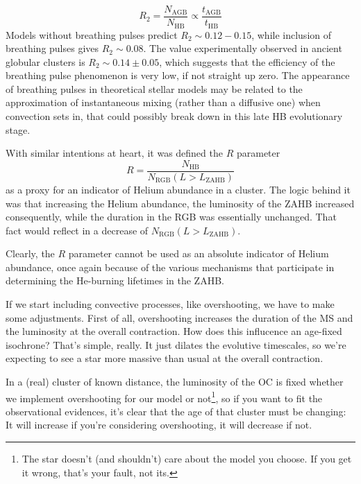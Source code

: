 \begin{equation}
    R_{2} = \frac{N_{\text{AGB}}}{N_{\text{HB}}}\propto \frac{t_{\text{AGB}}}{t_{\text{HB}}}
    \label{eq:r2param}
\end{equation}
Models without breathing pulses predict $R_{2}\sim 0.12-0.15$, while inclusion of breathing pulses gives $R_{2}\sim 0.08$. The value experimentally observed in ancient globular clusters is $R_{2}\sim 0.14 \pm 0.05$, which suggests that the efficiency of the breathing pulse phenomenon is very low, if not straight up zero. The appearance of breathing pulses in theoretical stellar models may be related to the approximation of instantaneous mixing (rather than a diffusive one) when convection sets in, that could possibly break down in this late HB evolutionary stage.
\par With similar intentions at heart, it was defined the $R$ parameter
\begin{equation}
    R = \frac{N_{\text{HB}}}{N_{\text{RGB}}(L>L_{\text{ZAHB}})}
    \label{eq:rparam}
\end{equation}
as a proxy for an indicator of Helium abundance in a cluster. The logic behind it was that increasing the Helium abundance, the luminosity of the ZAHB increased consequently, while the duration in the RGB was essentially unchanged. That fact would reflect in a decrease of $N_{\text{RGB}}(L>L_{\text{ZAHB}})$.
\par Clearly, the $R$ parameter cannot be used as an absolute indicator of Helium abundance, once again because of the various mechanisms that participate in determining the He-burning lifetimes in the ZAHB.
\par If we start including convective processes, like overshooting, we have to make some adjustments. First of all, overshooting increases the duration of the MS and the luminosity at the overall contraction. How does this influcence an age-fixed isochrone? That's simple, really. It just dilates the evolutive timescales, so we're expecting to see a star more massive than usual at the overall contraction.
\par In a (real) cluster of known distance, the luminosity of the OC is fixed whether we implement overshooting for our model or not\footnote{The star doesn't (and shouldn't) care about the model you choose. If you get it wrong, that's your fault, not its.}, so if you want to fit the observational evidences, it's clear that the age of that cluster must be changing: It will increase if you're considering overshooting, it will decrease if not.

